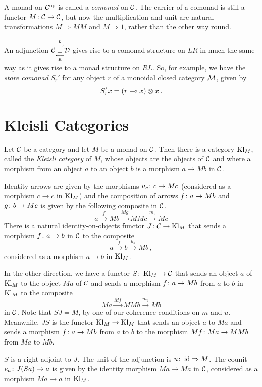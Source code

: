 \documentclass[11pt]{report}
\begin{document}
\begin{example}
  A monad on $\oppcat\C$ is called a \emph{comonad} on $\C$.  
  The carrier of a comonad is still a functor $M\from \C\to\C$, but now the multiplication and unit are natural transformations $M\Rightarrow MM$ and $M\Rightarrow 1$, rather than the other way round.  

  An adjunction $\adjunction\C LR\D$ gives rise to a comonad structure on $LR$ in much the same way as it gives rise to a monad structure on $RL$.  
  So, for example, we have the \emph{store comonad} $S_r'$ for any object $r$ of a monoidal closed category $\M$, given by
  \[
    S_r'x = (r \implies x) \tensor x\,.
    \]
\end{example}

\section{Kleisli Categories}

Let $\C$ be a category and let $M$ be a monad on $\C$.  
Then \cite{Kleisli} there is a category $\Kl_M$, called the \emph{Kleisli category} of $M$, whose objects are the objects of $\C$ and where a morphism from an object $a$ to an object $b$ is a morphism $a \to Mb$ in $\C$.

Identity arrows are given by the morphisms $u_c\from c \to M c$ (considered as a morphism $c\to c$ in $\Kl_M$) and the composition of arrows $f\from a \to Mb$ and $g \from b \to Mc$ is given by the following composite in $\C$.
\[
  a \xrightarrow{f}
  Mb \xrightarrow{Mg}
  MMc \xrightarrow{m_c}
  M c
  \]
There is a natural identity-on-objects functor $J\from \C \to \Kl_M$ that sends a morphism $f\from a \to b$ in $\C$ to the composite
\[
  a \xrightarrow{f}
  b \xrightarrow{u_b}
  M b\,,
  \]
considered as a morphism $a\to b$ in $\Kl_M$.

In the other direction, we have a functor $ S \from \Kl_M \to \C$ that sends an object $a$ of $\Kl_M$ to the object $Ma$ of $\C$ and sends a morphism $f\from a \to M b$ from $a$ to $b$ in $\Kl_M$ to the composite
\[
  Ma \xrightarrow{M f}
  MMb \xrightarrow{m_b}
  Mb
  \]
in $\C$.  
Note that $ S J=M$, by one of our coherence conditions on $m$ and $u$.
Meanwhile, $J S $ is the functor $\Kl_M\to\Kl_M$ that sends an object $a$ to $Ma$ and sends a morphism $f\from a \to Mb$ from $a$ to $b$ to the morphism $Mf\from Ma \to MMb$ from $Ma$ to $Mb$.
\begin{proposition}
  $ S $ is a right adjoint to $J$.
  The unit of the adjunction is $u\from \id \Rightarrow M$.  
  The counit $e_a\from J( S  a) \to a$ is given by the identity morphism $Ma \to Ma$ in $\C$, considered as a morphism $Ma \to a$ in $\Kl_M$.
  \label{prop:KleisliHasAdjunction}
\end{proposition}
\end{document}
